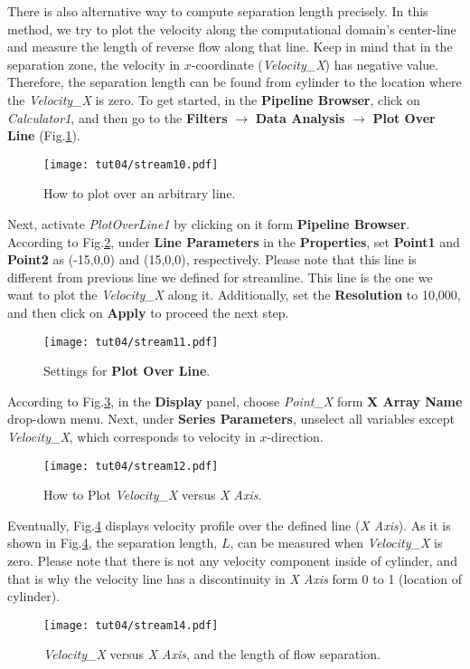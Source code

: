 There is also alternative way to compute separation length precisely. In this method, we try to plot the velocity along the computational domain's center-line and measure the length of reverse flow along that line. Keep in mind that in the separation zone, the velocity in $x$-coordinate (\textit{Velocity\_X}) has negative value. Therefore, the separation length can be found from cylinder to the location where the \textit{Velocity\_X} is zero. To get started, in the \textbf{Pipeline Browser}, click on \textit{Calculator1}, and then go to the \textbf{Filters} $\rightarrow$ \textbf{Data Analysis} $\rightarrow$ \textbf{Plot Over Line} (Fig.\ref{fig4:stream10_4}).
\begin{figure}[htbp]
    \centering
    \texttt{[image: tut04/stream10.pdf]}
    \caption{How to plot over an arbitrary line.}
    \label{fig4:stream10_4}
\end{figure}
Next, activate \textit{PlotOverLine1} by clicking on it form \textbf{Pipeline Browser}. According to Fig.\ref{fig4:stream11_4}, under \textbf{Line Parameters} in the \textbf{Properties}, set \textbf{Point1} and \textbf{Point2} as (-15,0,0) and (15,0,0), respectively. Please note that this line is different from previous line we defined for streamline. This line is the one we want to plot the \textit{Velocity\_X} along it. Additionally, set the \textbf{Resolution} to 10,000, and then click on \textbf{Apply} to proceed the next step.
\begin{figure}[htbp]
    \centering
    \texttt{[image: tut04/stream11.pdf]}
    \caption{Settings for \textbf{Plot Over Line}.}
    \label{fig4:stream11_4}
\end{figure}
According to Fig.\ref{fig4:stream12_4}, in the \textbf{Display} panel, choose \textit{Point\_X} form \textbf{X Array Name} drop-down menu. Next, under \textbf{Series Parameters}, unselect all variables except \textit{Velocity\_X}, which corresponds to velocity in $x$-direction.
\begin{figure}[htbp]
    \centering
    \texttt{[image: tut04/stream12.pdf]}
    \caption{How to Plot \textit{Velocity\_X} versus \textit{X Axis}.}
    \label{fig4:stream12_4}
\end{figure}
Eventually, Fig.\ref{fig4:stream14_4} displays velocity profile over the defined line (\textit{X Axis}). As it is shown in Fig.\ref{fig4:stream14_4}, the separation length, $L$, can be measured when \textit{Velocity\_X} is zero. Please note that there is not any velocity component inside of cylinder, and that is why the velocity line has a discontinuity in \textit{X Axis} form 0 to 1 (location of cylinder).
\begin{figure}[htbp]
    \centering
    \texttt{[image: tut04/stream14.pdf]}
    \caption{\textit{Velocity\_X} versus \textit{X Axis}, and the length of flow separation.}
    \label{fig4:stream14_4}
\end{figure}
